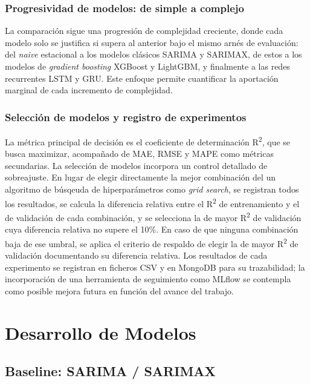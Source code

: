 \documentclass[12pt, a4paper]{article}
\begin{document}
\subsubsection{Progresividad de modelos: de simple a complejo}

La comparación sigue una progresión de complejidad creciente, donde cada modelo solo se justifica si supera al anterior bajo el mismo arnés de evaluación: del \textit{naive} estacional a los modelos clásicos SARIMA y SARIMAX, de estos a los modelos de \textit{gradient boosting} XGBoost y LightGBM, y finalmente a las redes recurrentes LSTM y GRU. Este enfoque permite cuantificar la aportación marginal de cada incremento de complejidad.

\subsubsection{Selección de modelos y registro de experimentos}

La métrica principal de decisión es el coeficiente de determinación R\textsuperscript{2}, que se busca maximizar, acompañado de MAE, RMSE y MAPE como métricas secundarias. La selección de modelos incorpora un control detallado de sobreajuste. En lugar de elegir directamente la mejor combinación del un algoritmo de búsqeuda de hiperparámetros como \textit{grid search}, se registran todos los resultados, se calcula la diferencia relativa entre el R\textsuperscript{2} de entrenamiento y el de validación de cada combinación, y se selecciona la de mayor R\textsuperscript{2} de validación cuya diferencia relativa no supere el 10\%. En caso de que ninguna combinación baja de ese umbral, se aplica el criterio de respaldo de elegir la de mayor R\textsuperscript{2} de validación documentando su diferencia relativa. Los resultados de cada experimento se registran en ficheros CSV y en MongoDB para su trazabilidad; la incorporación de una herramienta de seguimiento como MLflow se contempla como posible mejora futura en función del avance del trabajo.

\section{Desarrollo de Modelos}

\subsection{Baseline: SARIMA / SARIMAX}
\end{document}
